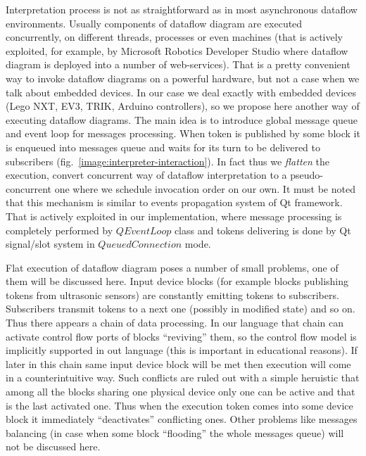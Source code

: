\documentclass[conference,compsoc]{IEEEtran}
\begin{document}
Interpretation process is not as straightforward as in most asynchronous dataflow environments. Usually components of dataflow diagram are executed concurrently, on different threads, processes or even machines (that is actively exploited, for example, by Microsoft Robotics Developer Studio where dataflow diagram is deployed into a number of web-services). That is a pretty convenient way to invoke dataflow diagrams on a powerful hardware, but not a case when we talk about embedded devices. In our case we deal exactly with embedded devices (Lego NXT, EV3, TRIK, Arduino controllers), so we propose here another way of executing dataflow diagrams. The main idea is to introduce global message queue and event loop for messages processing. When token is published by some block it is enqueued into messages queue and waits for its turn to be delivered to subscribers (fig.~\ref{image:interpreter-interaction}). In fact thus we \textit{flatten} the execution, convert concurrent way of dataflow interpretation to a pseudo-concurrent one where we schedule invocation order on our own. It must be noted that this mechanism is similar to events propagation system of Qt framework. That is actively exploited in our implementation, where message processing is completely performed by $QEventLoop$ class and tokens delivering is done by Qt signal/slot system in $QueuedConnection$ mode. 

Flat execution of dataflow diagram poses a number of small problems, one of them will be discussed here. Input device blocks (for example blocks publishing tokens from ultrasonic sensors) are constantly emitting tokens to subscribers. Subscribers transmit tokens to a next one (possibly in modified state) and so on. Thus there appears a chain of data processing. In our language that chain can activate control flow ports of blocks ``reviving'' them, so the control flow model is implicitly supported in out language (this is important in educational reasons). If later in this chain same input device block will be met then execution will come in a 
counterintuitive way. Such conflicts are ruled out with a simple heruistic that among all the blocks sharing one physical device only one can be active and that is the last activated one. Thus when the execution token comes into some device block it immediately ``deactivates'' conflicting ones. Other problems like messages balancing (in case when some block ``flooding'' the whole messages queue) will not be discussed here.
\end{document}
